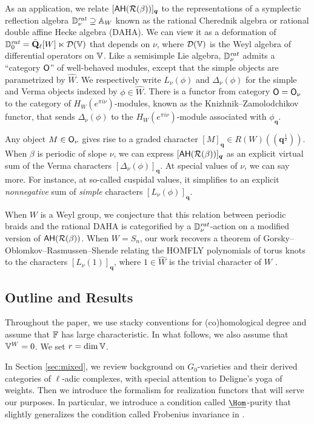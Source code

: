 \documentclass[a4paper,10pt,leqno]{amsart}
\theoremstyle{plain}
\theoremstyle{plain}
\theoremstyle{plain}
\theoremstyle{definition}
\theoremstyle{remark}
\newcommand{\Q}{\bm{q}}
\newcommand{\QL}{\bar{\mathbf{Q}}_\ell}
\newcommand{\rat}{\mathit{rat}}
\newcommand{\slope}{\nu}
\begin{document}
As an application, we relate $[\sf{AH}(\cal{R}(\beta))]_{\Q}$ to the representations of a symplectic reflection algebra $\bb{D}_\slope^\rat \supseteq \bb{A}_W$ known as the rational Cherednik algebra or rational double affine Hecke algebra (DAHA).
We can view it as a deformation of $\bb{D}_0^\rat = \QL[W] \ltimes \cal{D}(\bb{V})$ that depends on $\slope$, where $\cal{D}(\bb{V})$ is the Weyl algebra of differential operators on $\bb{V}$.
Like a semisimple Lie algebra, $\bb{D}_\slope^\rat$ admits a ``category $\sf{O}$'' of well-behaved modules, except that the simple objects are parametrized by $\hat{W}$.
We respectively write $L_\slope(\phi)$ and $\Delta_\slope(\phi)$ for the simple and Verma objects indexed by $\phi \in \hat{W}$.
There is a functor from category $\sf{O} = \sf{O}_\slope$ to the category of $H_W(e^{\pi i\slope})$-modules, known as the Knizhnik--Zamolodchikov functor, that sends $\Delta_\slope(\phi)$ to the $H_W(e^{\pi i\slope})$-module associated with $\phi_{\Q}$.

Any object $M \in \sf{O}_\slope$ gives rise to a graded character $[M]_{\Q} \in R(W)(\!(\Q^{\frac{1}{2}})\!)$.
When $\beta$ is periodic of slope $\slope$, we can express $[\sf{AH}(\cal{R}(\beta))]_{\Q}$ as an explicit virtual sum of the Verma characters $[\Delta_\slope(\phi)]_{\Q}$.
At special values of $\slope$, we can say more.
For instance, at so-called cuspidal values, it simplifies to an explicit \emph{nonnegative} sum of \emph{simple} characters $[L_\slope(\phi)]_{\Q}$.

When $W$ is a Weyl group, we conjecture that this relation between periodic braids and the rational DAHA is categorified by a $\bb{D}_\slope^\rat$-action on a modified version of $\sf{AH}(\cal{R}(\beta))$.
When $W = S_n$, our work recovers a theorem of Gorsky--Oblomkov--Rasmussen--Shende relating the HOMFLY polynomials of torus knots to the characters $[L_\slope(1)]_{\Q}$, where $1 \in \hat{W}$ is the trivial character of $W$ \cite{gors}.

\subsection{Outline and Results}

Throughout the paper, we use stacky conventions for (co)homological degree and assume that $\bb{F}$ has large characteristic.
In what follows, we also assume that $\bb{V}^W = 0$.
We set $r = \dim \bb{V}$.

In Section \ref{sec:mixed}, we review background on $G_0$-varieties and their derived categories of $\ell$-adic complexes, with special attention to Deligne's yoga of weights.
Then we introduce the formalism for realization functors that will serve our purposes.
In particular, we introduce a condition called $\SHom$-purity that slightly generalizes the condition called Frobenius invariance in \cite{rider}.
\end{document}
